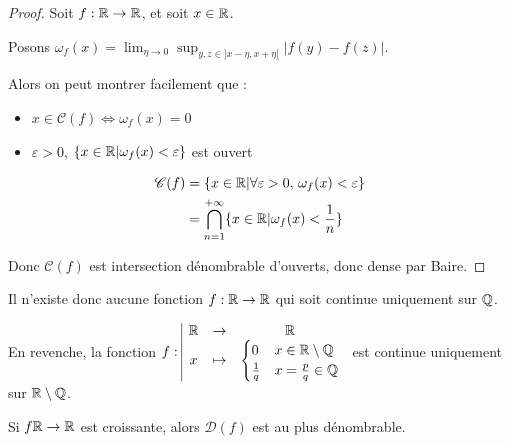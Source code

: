 \begin{proof}
    Soit $f : \mathbb{R} \to \mathbb{R}$, et soit $x \in \mathbb{R}$. 

    Posons $\omega_f(x) = \lim_{\eta \to 0} \sup_{y, z \in ]x - \eta, x + \eta[} |f(y) - f(z)|$.

    Alors on peut montrer facilement que : 
    \begin{itemize}
        \item $x \in \mathscr C(f) \Leftrightarrow \omega_f(x) = 0$
        \item $\varepsilon > 0$, $\{ x \in \mathbb{R} | \omega_f(x) < \varepsilon \}$ est ouvert
    \end{itemize}

    \begin{align*}
        \mathscr C(f) & = \{ x \in \mathbb{R} | \forall \varepsilon > 0, \, \omega_f(x) < \varepsilon \}\\
        & = \bigcap_{n=1}^{+\infty} \{ x \in \mathbb{R} | \omega_f(x) < \frac{1}{n} \}
    \end{align*}

    Donc $\mathscr C(f)$ est intersection dénombrable d'ouverts, donc dense par Baire.
\end{proof}


\begin{corollaire}{}{}
    Il n'existe donc aucune fonction $f : \mathbb{R} \to \mathbb{R}$ qui soit continue uniquement sur $\mathbb{Q}$.
\end{corollaire}

En revenche, la fonction 
$f: \space \begin{array}{|ccc} \displaystyle \mathbb{R} & \to & \displaystyle \mathbb{R} \\ \displaystyle x & \mapsto & \displaystyle  \begin{cases} 0 & x \in \mathbb{R} \setminus \mathbb{Q} \\ \frac 1 q & x = \frac p q \in \mathbb{Q} \end{cases}  \end{array}$ 
est continue uniquement sur $\mathbb{R} \setminus \mathbb{Q}$.

\begin{proposition}{}{}
    Si $f \mathbb{R} \to \mathbb{R}$ est croissante, alors $\mathscr D(f)$ est au plus dénombrable.
\end{proposition}

